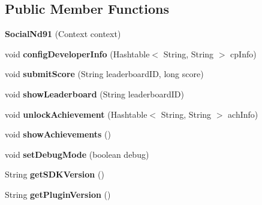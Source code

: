\subsection*{Public Member Functions}
\begin{DoxyCompactItemize}
\item 
\mbox{\label{classorg_1_1cocos2dx_1_1plugin_1_1SocialNd91_ac89ba1f8eeb3643b3129493569935c9c}} 
{\bfseries Social\+Nd91} (Context context)
\item 
\mbox{\label{classorg_1_1cocos2dx_1_1plugin_1_1SocialNd91_a2bb7509fbf6773b73effe91631ed65da}} 
void {\bfseries config\+Developer\+Info} (Hashtable$<$ String, String $>$ cp\+Info)
\item 
\mbox{\label{classorg_1_1cocos2dx_1_1plugin_1_1SocialNd91_ad9bef578f74577eba8bd045c198eb085}} 
void {\bfseries submit\+Score} (String leaderboard\+ID, long score)
\item 
\mbox{\label{classorg_1_1cocos2dx_1_1plugin_1_1SocialNd91_a5a0f0a5dd9d2b28f680938e267e8fa3f}} 
void {\bfseries show\+Leaderboard} (String leaderboard\+ID)
\item 
\mbox{\label{classorg_1_1cocos2dx_1_1plugin_1_1SocialNd91_a4472a0c95393589bd7812be7fc1798fd}} 
void {\bfseries unlock\+Achievement} (Hashtable$<$ String, String $>$ ach\+Info)
\item 
\mbox{\label{classorg_1_1cocos2dx_1_1plugin_1_1SocialNd91_aaa850c47af2e352150f87d26892feaf8}} 
void {\bfseries show\+Achievements} ()
\item 
\mbox{\label{classorg_1_1cocos2dx_1_1plugin_1_1SocialNd91_ad560bc26414d74ce2815420e351b5aa4}} 
void {\bfseries set\+Debug\+Mode} (boolean debug)
\item 
\mbox{\label{classorg_1_1cocos2dx_1_1plugin_1_1SocialNd91_aef3e6b2369a2a4c0b4a136be5866e83d}} 
String {\bfseries get\+S\+D\+K\+Version} ()
\item 
\mbox{\label{classorg_1_1cocos2dx_1_1plugin_1_1SocialNd91_a6f8e0ec7b867396ea65a3b525b877a84}} 
String {\bfseries get\+Plugin\+Version} ()
\end{DoxyCompactItemize}
